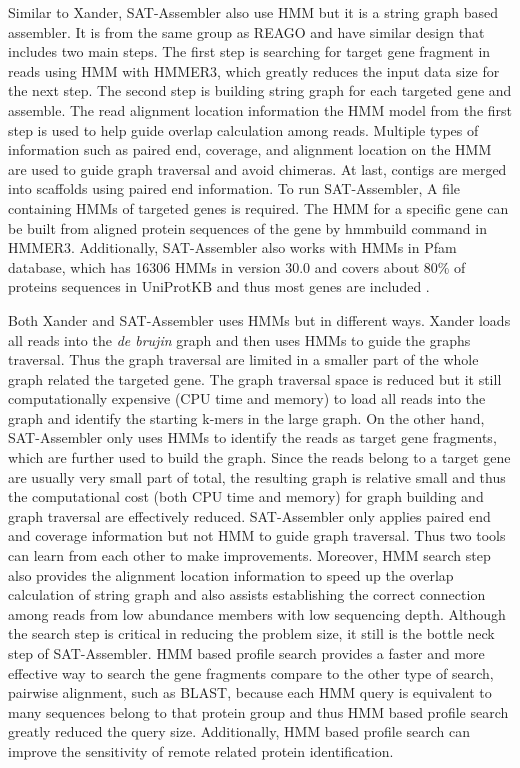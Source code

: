 \documentclass[]{msu-thesis}
\begin{document}
Similar to Xander, SAT-Assembler also use HMM but it is a string graph
based assembler. It is from the same group as REAGO and have similar
design that includes two main steps. The first step is searching for
target gene fragment in reads using HMM with HMMER3, which greatly
reduces the input data size for the next step. The second step is
building string graph for each targeted gene and assemble. The read
alignment location information the HMM model from the first step is
used to help guide overlap calculation among reads. Multiple types of
information such as paired end, coverage, and alignment location on
the HMM are used to guide graph traversal and avoid chimeras. At last,
contigs are merged into scaffolds using paired end information.  To
run SAT-Assembler, A file containing HMMs of targeted genes is
required. The HMM for a specific gene can be built from aligned
protein sequences of the gene by hmmbuild command in
HMMER3. Additionally, SAT-Assembler also works with HMMs in Pfam
database, which has 16306 HMMs in version 30.0 and covers about 80\%
of proteins sequences in UniProtKB and thus most genes are included
\cite{finn_pfam_2016}.

Both Xander and SAT-Assembler uses HMMs but in different ways. Xander
loads all reads into the \textit{de brujin} graph and then uses HMMs
to guide the graphs traversal. Thus the graph traversal are limited in
a smaller part of the whole graph related the targeted gene. The graph
traversal space is reduced but it still computationally expensive (CPU
time and memory) to load all reads into the graph and identify the
starting k-mers in the large graph.  On the other hand, SAT-Assembler
only uses HMMs to identify the reads as target gene fragments, which
are further used to build the graph. Since the reads belong to a
target gene are usually very small part of total, the resulting graph
is relative small and thus the computational cost (both CPU time and
memory) for graph building and graph traversal are effectively
reduced. SAT-Assembler only applies paired end and coverage
information but not HMM to guide graph traversal. Thus two tools can
learn from each other to make improvements.  Moreover, HMM search step
also provides the alignment location information to speed up the
overlap calculation of string graph and also assists establishing the
correct connection among reads from low abundance members with low
sequencing depth.  Although the search step is critical in reducing
the problem size, it still is the bottle neck step of
SAT-Assembler. HMM based profile search provides a faster and more
effective way to search the gene fragments compare to the other type
of search, pairwise alignment, such as BLAST, because each HMM query
is equivalent to many sequences belong to that protein group and thus
HMM based profile search greatly reduced the query size. Additionally,
HMM based profile search can improve the sensitivity of remote related
protein identification.
\end{document}
